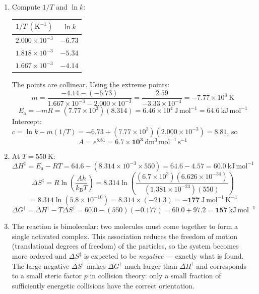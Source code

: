 \documentclass[11pt]{article}
\begin{document}
\begin{corrige}[Exercise 5.1]
\begin{enumerate}
  \item Compute $1/T$ and $\ln k$:
  \begin{center}
  \begin{tabular}{cc}
  \hline
  $1/T\ (\mathrm{K^{-1}})$ & $\ln k$ \\ \hline
  $2.000\times10^{-3}$ & $-6.73$ \\
  $1.818\times10^{-3}$ & $-5.34$ \\
  $1.667\times10^{-3}$ & $-4.14$ \\ \hline
  \end{tabular}
  \end{center}
  The points are collinear. Using the extreme points:
  \[
  m = \frac{-4.14-(-6.73)}{1.667\times10^{-3}-2.000\times10^{-3}}
  = \frac{2.59}{-3.33\times10^{-4}} = -7.77\times10^{3}\ \mathrm{K}
  \]
  \[
  E_{\mathrm{a}} = -mR = (7.77\times10^{3})(8.314) = 6.46\times10^{4}\ \mathrm{J\,mol^{-1}} = \mathbf{64.6\ \mathrm{kJ\,mol^{-1}}}
  \]
  Intercept: $c = \ln k - m(1/T) = -6.73 + (7.77\times10^{3})(2.000\times10^{-3}) = 8.81$, so
  \[
  A = e^{8.81} = \mathbf{6.7\times10^{3}\ \mathrm{dm^3\,mol^{-1}\,s^{-1}}}
  \]
  \item At $T = 550\ \mathrm{K}$:
  \[
  \Delta H^{\ddagger} = E_{\mathrm{a}} - RT = 64.6 - (8.314\times10^{-3}\times550) = 64.6 - 4.57 = \mathbf{60.0\ \mathrm{kJ\,mol^{-1}}}
  \]
  \[
  \Delta S^{\ddagger} = R\ln\!\left(\frac{Ah}{k_{\mathrm{B}}T}\right)
  = 8.314\ln\!\left(\frac{(6.7\times10^{3})(6.626\times10^{-34})}{(1.381\times10^{-23})(550)}\right)
  \]
  \[
  = 8.314\ln(5.8\times10^{-10}) = 8.314\times(-21.3) = \mathbf{-177\ \mathrm{J\,mol^{-1}\,K^{-1}}}
  \]
  \[
  \Delta G^{\ddagger} = \Delta H^{\ddagger} - T\Delta S^{\ddagger}
  = 60.0 - (550)(-0.177) = 60.0 + 97.2 = \mathbf{157\ \mathrm{kJ\,mol^{-1}}}
  \]
  \item The reaction is bimolecular: two  molecules must come together to form a single activated complex. This association reduces the freedom of motion (translational degrees of freedom) of the particles, so the system becomes more ordered and $\Delta S^{\ddagger}$ is expected to be \emph{negative} --- exactly what is found. The large negative $\Delta S^{\ddagger}$ makes $\Delta G^{\ddagger}$ much larger than $\Delta H^{\ddagger}$ and corresponds to a small steric factor $p$ in collision theory: only a small fraction of sufficiently energetic collisions have the correct orientation.
\end{enumerate}
\end{corrige}
\end{document}
